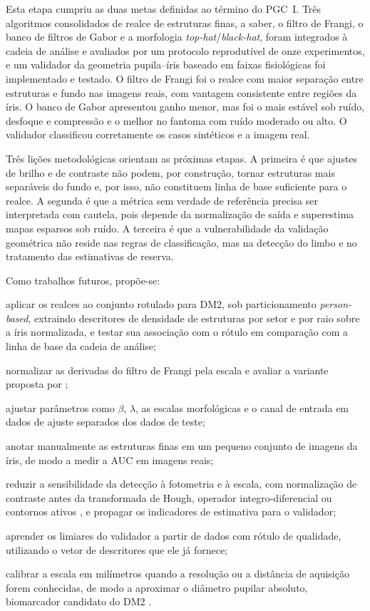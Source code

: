 \documentclass[12pt, oneside, a4paper, chapter=TITLE, section=TITLE,
               english, brazil]{abntex2}
\newcommand{\bh}{\emph{black-hat}}
\newcommand{\tht}{\emph{top-hat}}
\begin{document}
Esta etapa cumpriu as duas metas definidas ao término do PGC~I. Três
algoritmos consolidados de realce de estruturas finas, a saber, o filtro de
Frangi, o banco de filtros de Gabor e a morfologia \tht{}/\bh{}, foram
integrados à cadeia de análise e avaliados por um protocolo reprodutível de
onze experimentos, e um validador da geometria pupila--íris baseado em faixas
fisiológicas foi implementado e testado. O filtro de Frangi foi o realce com
maior separação entre estruturas e fundo nas imagens reais, com vantagem
consistente entre regiões da íris. O banco de Gabor apresentou ganho menor,
mas foi o mais estável sob ruído, desfoque e compressão e o melhor no fantoma
com ruído moderado ou alto. O validador classificou corretamente os casos
sintéticos e a imagem real.

Três lições metodológicas orientam as próximas etapas. A primeira é que
ajustes de brilho e de contraste não podem, por construção, tornar estruturas
mais separáveis do fundo e, por isso, não constituem linha de base suficiente
para o realce. A segunda é que a métrica sem verdade de referência precisa ser
interpretada com cautela, pois depende da normalização de saída e superestima
mapas esparsos sob ruído. A terceira é que a vulnerabilidade da validação
geométrica não reside nas regras de classificação, mas na detecção do limbo e
no tratamento das estimativas de reserva.

Como trabalhos futuros, propõe-se:
\begin{alineas}
  \item aplicar os realces ao conjunto rotulado para DM2, sob particionamento
  \emph{person-based}, extraindo descritores de densidade de estruturas por
  setor e por raio sobre a íris normalizada, e testar sua associação com o
  rótulo em comparação com a linha de base da cadeia de análise;
  \item normalizar as derivadas do filtro de Frangi pela escala
  \citep*{Lindeberg1998} e avaliar a variante proposta por
  \citet{Jerman2016};
  \item ajustar parâmetros como $\beta$, $\lambda$, as escalas morfológicas e
  o canal de entrada em dados de ajuste separados dos dados de teste;
  \item anotar manualmente as estruturas finas em um pequeno conjunto de
  imagens da íris, de modo a medir a AUC em imagens reais;
  \item reduzir a sensibilidade da detecção à fotometria e à escala, com
  normalização de contraste antes da transformada de Hough, operador
  integro-diferencial \citep*{Daugman2004} ou contornos ativos
  \citep*{Kass1988}, e propagar os indicadores de estimativa para o
  validador;
  \item aprender os limiares do validador a partir de dados com rótulo de
  qualidade, utilizando o vetor de descritores que ele já fornece;
  \item calibrar a escala em milímetros quando a resolução ou a distância de
  aquisição forem conhecidas, de modo a aproximar o diâmetro pupilar
  absoluto, biomarcador candidato do DM2 \citep*{Cui2024,Thakar2025}.
\end{alineas}
\end{document}
